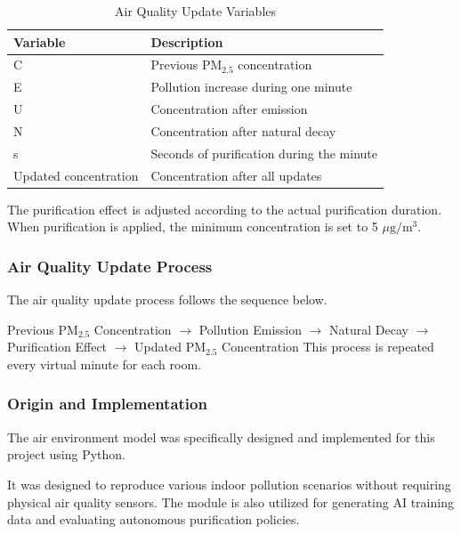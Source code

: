 \documentclass[conference]{IEEEtran}
\newlength{\tablebodywidth}
\newcommand{\pmfine}{\ensuremath{\mathrm{PM}_{2.5}}}
\newcommand{\pmunit}{\ensuremath{\mu\mathrm{g}/\mathrm{m}^3}}
\begin{document}
\begin{table}[!t]
\caption{Air Quality Update Variables}
\label{tab:t20}
\centering\footnotesize
\setlength{\tabcolsep}{3pt}
\setlength{\tablebodywidth}{\dimexpr\columnwidth-12pt\relax}
\begin{tabular}{>{\raggedright\arraybackslash}p{0.350\tablebodywidth}>{\raggedright\arraybackslash}p{0.650\tablebodywidth}}
\toprule
\textbf{Variable} & \textbf{Description} \\
\midrule
C & Previous \pmfine{} concentration \\
E & Pollution increase during one minute \\
U & Concentration after emission \\
N & Concentration after natural decay \\
s & Seconds of purification during the minute \\
Updated concentration & Concentration after all updates \\
\bottomrule
\end{tabular}
\end{table}

The purification effect is adjusted according to the actual purification duration. When purification is applied, the minimum concentration is set to 5 \pmunit{}.

\subsubsection{Air Quality Update Process}

The air quality update process follows the sequence below.

Previous \pmfine{} Concentration \ensuremath{\rightarrow} Pollution Emission \ensuremath{\rightarrow} Natural Decay \ensuremath{\rightarrow} Purification Effect \ensuremath{\rightarrow} Updated \pmfine{} Concentration This process is repeated every virtual minute for each room.

\subsubsection{Origin and Implementation}

The air environment model was specifically designed and implemented for this project using Python.

It was designed to reproduce various indoor pollution scenarios without requiring physical air quality sensors. The module is also utilized for generating AI training data and evaluating autonomous purification policies.
\end{document}
